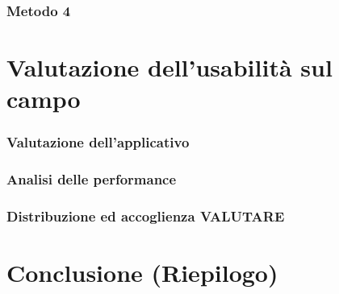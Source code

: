 \documentclass{article}
\begin{document}
		\subsubsection{Metodo 4}
	\section{Valutazione dell'usabilità sul campo}
		\subsubsection{Valutazione dell'applicativo}
		\subsubsection{Analisi delle performance}
		\subsubsection{Distribuzione ed accoglienza VALUTARE}
	\section{Conclusione (Riepilogo)}
		
\end{document}
